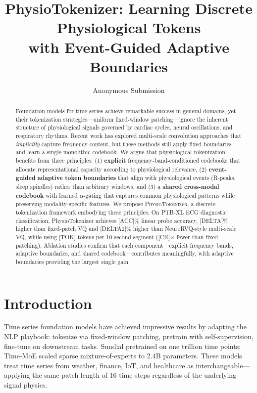 \documentclass[letterpaper]{article}
\title{PhysioTokenizer: Learning Discrete Physiological Tokens \\
with Event-Guided Adaptive Boundaries}
\author{Anonymous Submission}
\begin{document}
\maketitle

\begin{abstract}
Foundation models for time series achieve remarkable success in general domains,
yet their tokenization strategies---uniform fixed-window patching---ignore the
inherent structure of physiological signals governed by cardiac cycles, neural
oscillations, and respiratory rhythms. Recent work has explored multi-scale
convolution approaches that \textit{implicitly} capture frequency content, but
these methods still apply fixed boundaries and learn a single monolithic codebook.
We argue that physiological tokenization benefits from three principles: (1)
\textbf{explicit} frequency-band-conditioned codebooks that allocate
representational capacity according to physiological relevance,
(2) \textbf{event-guided adaptive token boundaries} that align with
physiological events (R-peaks, sleep spindles) rather than arbitrary windows,
and (3) a \textbf{shared cross-modal codebook} with learned $\alpha$-gating
that captures common physiological patterns while preserving modality-specific
features. We propose \textsc{PhysioTokenizer}, a discrete tokenization framework
embodying these principles. On PTB-XL ECG diagnostic classification,
PhysioTokenizer achieves [ACC]\% linear probe accuracy, [DELTA]\% higher than
fixed-patch VQ and [DELTA2]\% higher than NeuroRVQ-style multi-scale VQ,
while using [TOK] tokens per 10-second segment ([CR]$\times$ fewer than
fixed patching). Ablation studies confirm that each component---explicit
frequency bands, adaptive boundaries, and shared codebook---contributes
meaningfully, with adaptive boundaries providing the largest single gain.
\end{abstract}

\section{Introduction}

Time series foundation models \cite{liu2025sundial,shi2024time,goswami2024moment}
have achieved impressive results by adapting the NLP playbook: tokenize via
fixed-window patching, pretrain with self-supervision, fine-tune on downstream
tasks. Sundial \cite{liu2025sundial} pretrained on one trillion time points;
Time-MoE \cite{shi2024time} scaled sparse mixture-of-experts to 2.4B parameters.
These models treat time series from weather, finance, IoT, and healthcare as
interchangeable---applying the same patch length of 16 time steps regardless
of the underlying signal physics.
\end{document}
